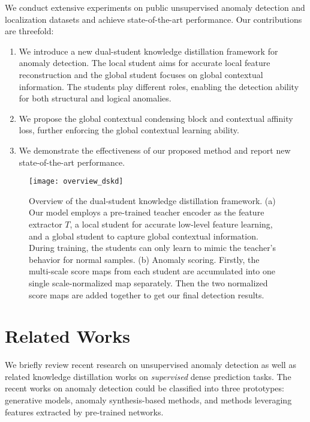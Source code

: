 \documentclass[10pt,twocolumn,letterpaper]{article}
\begin{document}
We conduct extensive experiments on public unsupervised anomaly detection and localization datasets and achieve state-of-the-art performance. Our contributions are threefold:
\begin{enumerate}
    \item We introduce a new dual-student knowledge distillation framework for anomaly detection. The local student aims for accurate local feature reconstruction and the global student focuses on global contextual information. The students play different roles, enabling the detection ability for both structural and logical anomalies.
    \item We propose the global contextual condensing block and contextual affinity loss, further enforcing the global contextual learning ability.
    \item We demonstrate the effectiveness of our proposed method and report new state-of-the-art performance.
\end{enumerate}















\begin{figure*}
  \centering
    \texttt{[image: overview\_dskd]}

  \caption{Overview of the dual-student knowledge distillation framework. (a) Our model employs a pre-trained teacher encoder as the feature extractor $T$, a local student for accurate low-level feature learning, and a global student to capture global contextual information. During training, the students can only learn to mimic the teacher's behavior for normal samples. (b) Anomaly scoring. Firstly, the multi-scale score maps from each student are accumulated into one single scale-normalized map separately. Then the two normalized score maps are added together to get our final detection results.}
    \label{fig_overview}
\end{figure*}

\section{Related Works}
\label{related work}
We briefly review recent research on unsupervised anomaly detection as well as related knowledge distillation works on \textit{supervised} dense prediction tasks. The recent works on 
anomaly detection could be classified into three prototypes: generative models, anomaly synthesis-based methods, and methods leveraging features extracted by pre-trained networks. 
\end{document}

